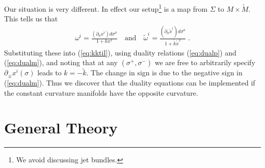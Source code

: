\documentclass[a4paper,12pt]{article}
\newcommand{\Mtil}{\widetilde{M}}
\newcommand{\ktil}{\tilde{k}}
\newcommand{\omegatil}{\tilde{\omega}}
\newcommand{\xtil}{\tilde{x}}
\begin{document}
Our situation is very different.  In effect our setup\footnote{We
avoid discussing jet bundles.} is a map from $\Sigma$ to
$M\times\Mtil$.  This tells us that
\begin{eqnarray*}
    \omega^{i}= \frac{(\partial_{a}x^{i})d\sigma^{a}}{1 + k x^{2}} 
    \quad\mbox{and}\quad
    \omegatil^{i} =\frac{(\partial_{a}\xtil^{i})d\sigma^{a}}{1 + 
    \ktil \xtil^{2}}\;.
\end{eqnarray*}
Substituting these into (\ref{eq:kktil}), using duality relations 
(\ref{eq:dualp}) and (\ref{eq:dualm}), and noting that at 
any $(\sigma^{+},\sigma^{-})$ we are free to arbitrarily specify 
$\partial_{\pm}x^{i}(\sigma)$ leads to $k = -\ktil$.  The 
change in sign is due to the negative sign in (\ref{eq:dualm}). Thus we 
discover that the duality equations can be implemented if the 
constant curvature manifolds have the opposite curvature.


\section{General Theory}
\label{sec:general}
\end{document}
